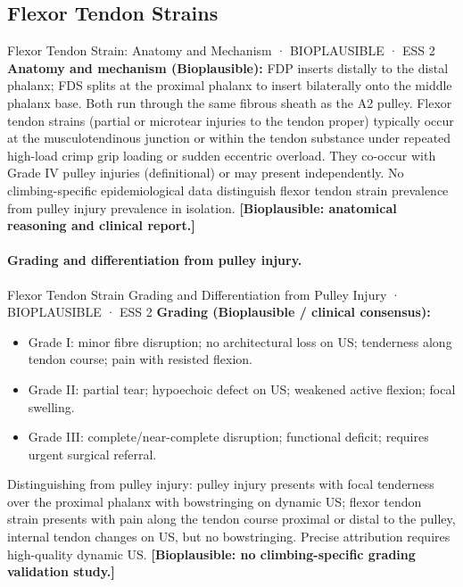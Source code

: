 \subsection{Flexor Tendon Strains}
\label{subsec:flexortendon}

\begin{bioplausbox}{Flexor Tendon Strain: Anatomy and Mechanism · BIOPLAUSIBLE · ESS 2}
\textbf{Anatomy and mechanism (Bioplausible):} FDP inserts distally to the distal phalanx; FDS splits at the proximal phalanx to insert bilaterally onto the middle phalanx base. Both run through the same fibrous sheath as the A2 pulley. Flexor tendon strains (partial or microtear injuries to the tendon proper) typically occur at the musculotendinous junction or within the tendon substance under repeated high-load crimp grip loading or sudden eccentric overload. They co-occur with Grade IV pulley injuries (definitional) or may present independently. No climbing-specific epidemiological data distinguish flexor tendon strain prevalence from pulley injury prevalence in isolation. \textbf{[Bioplausible: anatomical reasoning and clinical report.]}
\end{bioplausbox}

\paragraph{Grading and differentiation from pulley injury.}\leavevmode

\begin{bioplausbox}{Flexor Tendon Strain Grading and Differentiation from Pulley Injury · BIOPLAUSIBLE · ESS 2}
\textbf{Grading (Bioplausible / clinical consensus):}
\begin{itemize}[leftmargin=1.5em,noitemsep]
  \item Grade I: minor fibre disruption; no architectural loss on US; tenderness along tendon course; pain with resisted flexion.
  \item Grade II: partial tear; hypoechoic defect on US; weakened active flexion; focal swelling.
  \item Grade III: complete/near-complete disruption; functional deficit; requires urgent surgical referral.
\end{itemize}
Distinguishing from pulley injury: pulley injury presents with focal tenderness over the proximal phalanx with bowstringing on dynamic US; flexor tendon strain presents with pain along the tendon course proximal or distal to the pulley, internal tendon changes on US, but no bowstringing. Precise attribution requires high-quality dynamic US. \textbf{[Bioplausible: no climbing-specific grading validation study.]}
\end{bioplausbox}

